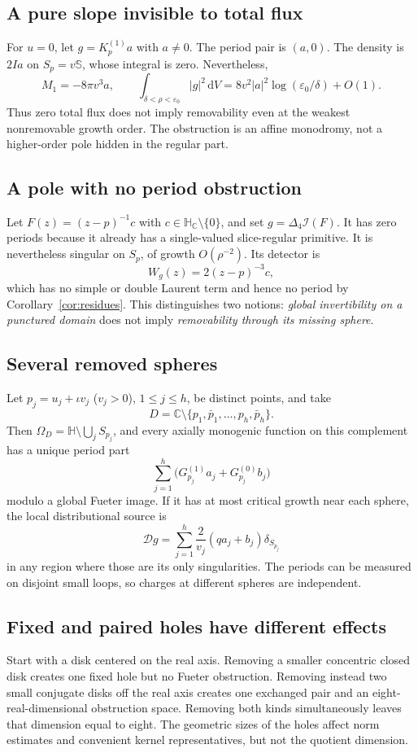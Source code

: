 \documentclass[11pt,a4paper]{article}
\numberwithin{equation}{section}
\theoremstyle{definition}
\theoremstyle{remark}
\newcommand{\C}{\mathbb C}
\newcommand{\HH}{\mathbb H}
\newcommand{\HC}{\mathbb H_{\C}}
\newcommand{\SSS}{\mathbb S}
\newcommand{\cI}{\mathcal I}
\newcommand{\cD}{\mathcal D}
\newcommand{\lap}{\Delta_4}
\newcommand{\dd}{\,\mathrm d}
\begin{document}
\subsection{A pure slope invisible to total flux}
For $u=0$, let $g=K_p^{(1)}a$ with $a\ne0$. The period pair is $(a,0)$.
The density is $2Ia$ on $S_p=v\SSS$, whose integral is zero. Nevertheless,
\[
 M_1=-8\pi v^3a,\qquad
 \int_{\delta<\rho<\varepsilon_0}|g|^2\dd V
       =8v^2|a|^2\log(\varepsilon_0/\delta)+O(1).
\]
Thus zero total flux does not imply removability even at the weakest
nonremovable growth order. The obstruction is an affine monodromy, not a
higher-order pole hidden in the regular part.

\subsection{A pole with no period obstruction}
Let $F(z)=(z-p)^{-1}c$ with $c\in\HC\setminus\{0\}$, and set
$g=\lap\cI(F)$. It has zero periods because it already has a single-valued
slice-regular primitive. It is nevertheless singular on $S_p$, of growth
$O(\rho^{-2})$. Its detector is
\[
 W_g(z)=2(z-p)^{-3}c,
\]
which has no simple or double Laurent term and hence no period by
Corollary~\ref{cor:residues}. This distinguishes two notions:
\emph{global invertibility on a punctured domain} does not imply
\emph{removability through its missing sphere}.

\subsection{Several removed spheres}
Let $p_j=u_j+\iota v_j$ ($v_j>0$), $1\leq j\leq h$, be distinct points, and take
\[
 D=\C\setminus\{p_1,\bar p_1,\ldots,p_h,\bar p_h\}.
\]
Then $\Omega_D=\HH\setminus\bigcup_j S_{p_j}$, and every axially monogenic
function on this complement has a unique period part
\[
 \sum_{j=1}^h\bigl(G_{p_j}^{(1)}a_j+G_{p_j}^{(0)}b_j\bigr)
\]
modulo a global Fueter image. If it has at most critical growth near each
sphere, the local distributional source is
\[
 \cD g=\sum_{j=1}^h\frac{2}{v_j}(q a_j+b_j)\delta_{S_{p_j}}
\]
in any region where those are its only singularities. The periods can be measured on disjoint small loops, so charges at different
spheres are independent.

\subsection{Fixed and paired holes have different effects}
Start with a disk centered on the real axis. Removing a smaller concentric
closed disk creates one fixed hole but no Fueter obstruction. Removing instead
two small conjugate disks off the real axis creates one exchanged pair and an
eight-real-dimensional obstruction space. Removing both kinds simultaneously
leaves that dimension equal to eight. The geometric sizes of the holes affect
norm estimates and convenient kernel representatives, but not the quotient
dimension.
\end{document}
